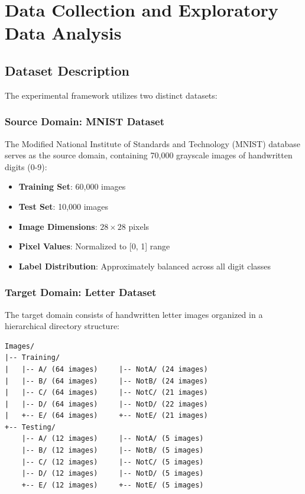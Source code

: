 \documentclass[12pt,a4paper]{article}
\begin{document}
\section{Data Collection and Exploratory Data Analysis}

\subsection{Dataset Description}

The experimental framework utilizes two distinct datasets:

\subsubsection{Source Domain: MNIST Dataset}

The Modified National Institute of Standards and Technology (MNIST) database serves as the source domain, containing 70,000 grayscale images of handwritten digits (0-9):
\begin{itemize}
    \item \textbf{Training Set}: 60,000 images
    \item \textbf{Test Set}: 10,000 images
    \item \textbf{Image Dimensions}: $28 \times 28$ pixels
    \item \textbf{Pixel Values}: Normalized to [0, 1] range
    \item \textbf{Label Distribution}: Approximately balanced across all digit classes
\end{itemize}

\subsubsection{Target Domain: Letter Dataset}

The target domain consists of handwritten letter images organized in a hierarchical directory structure:

\begin{verbatim}
Images/
|-- Training/
|   |-- A/ (64 images)     |-- NotA/ (24 images)
|   |-- B/ (64 images)     |-- NotB/ (24 images)
|   |-- C/ (64 images)     |-- NotC/ (21 images)
|   |-- D/ (64 images)     |-- NotD/ (22 images)
|   +-- E/ (64 images)     +-- NotE/ (21 images)
+-- Testing/
    |-- A/ (12 images)     |-- NotA/ (5 images)
    |-- B/ (12 images)     |-- NotB/ (5 images)
    |-- C/ (12 images)     |-- NotC/ (5 images)
    |-- D/ (12 images)     |-- NotD/ (5 images)
    +-- E/ (12 images)     +-- NotE/ (5 images)
\end{verbatim}
\end{document}

